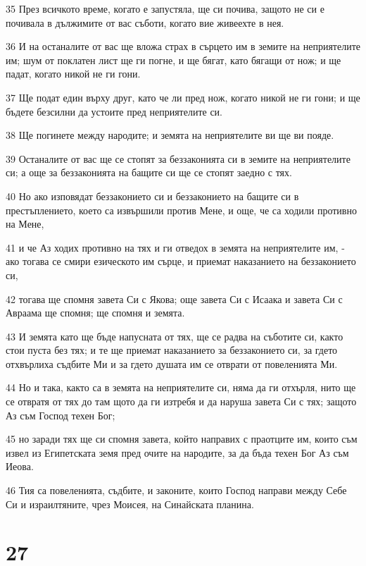 \par 35 През всичкото време, когато е запустяла, ще си почива, защото не си е почивала в дължимите от вас съботи, когато вие живеехте в нея.
\par 36 И на останалите от вас ще вложа страх в сърцето им в земите на неприятелите им; шум от поклатен лист ще ги погне, и ще бягат, като бягащи от нож; и ще падат, когато никой не ги гони.
\par 37 Ще подат един върху друг, като че ли пред нож, когато никой не ги гони; и ще бъдете безсилни да устоите пред неприятелите си.
\par 38 Ще погинете между народите; и земята на неприятелите ви ще ви пояде.
\par 39 Останалите от вас ще се стопят за беззаконията си в земите на неприятелите си; а още за беззаконията на бащите си ще се стопят заедно с тях.
\par 40 Но ако изповядат беззаконието си и беззаконието на бащите си в престъплението, което са извършили против Мене, и още, че са ходили противно на Мене,
\par 41 и че Аз ходих противно на тях и ги отведох в земята на неприятелите им, - ако тогава се смири езическото им сърце, и приемат наказанието на беззаконието си,
\par 42 тогава ще спомня завета Си с Якова; още завета Си с Исаака и завета Си с Авраама ще спомня; ще спомня и земята.
\par 43 И земята като ще бъде напусната от тях, ще се радва на съботите си, както стои пуста без тях; и те ще приемат наказанието за беззаконието си, за гдето отхвърлиха съдбите Ми и за гдето душата им се отврати от повеленията Ми.
\par 44 Но и така, както са в земята на неприятелите си, няма да ги отхърля, нито ще се отвратя от тях до там щото да ги изтребя и да наруша завета Си с тях; защото Аз съм Господ техен Бог;
\par 45 но заради тях ще си спомня завета, който направих с праотците им, които съм извел из Египетската земя пред очите на народите, за да бъда техен Бог Аз съм Иеова.
\par 46 Тия са повеленията, съдбите, и законите, които Господ направи между Себе Си и израилтяните, чрез Моисея, на Синайската планина.

\chapter{27}


